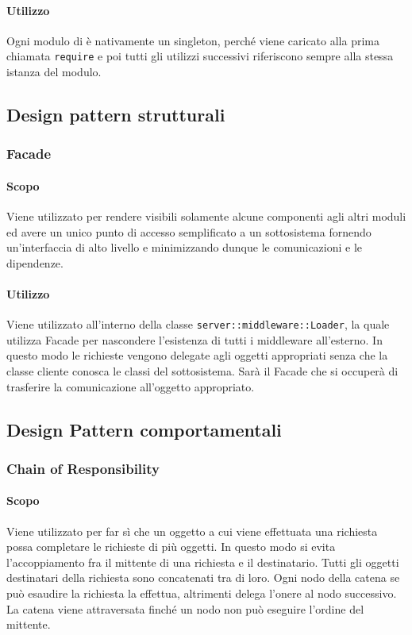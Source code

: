 \documentclass[12pt,a4paper]{article}
\begin{document}
\paragraph{Utilizzo}
Ogni modulo di  è nativamente un singleton, perché viene caricato alla prima chiamata \texttt{require} e poi tutti gli utilizzi successivi riferiscono sempre alla stessa istanza del modulo.

\subsection{Design pattern strutturali}

\subsubsection{Facade}
\paragraph{Scopo}
Viene utilizzato per rendere visibili solamente alcune componenti agli altri moduli ed avere un unico punto di accesso semplificato a un sottosistema fornendo un’interfaccia di alto livello e minimizzando dunque le comunicazioni e le dipendenze.

\paragraph{Utilizzo}
Viene utilizzato all’interno della classe \texttt{server::middleware::Loader}, la quale utilizza Facade per nascondere l’esistenza di tutti i middleware all'esterno. In questo modo le richieste vengono delegate agli oggetti appropriati senza che la classe cliente conosca le classi del sottosistema. Sarà il Facade che si occuperà di trasferire la comunicazione all’oggetto appropriato.

\subsection{Design Pattern comportamentali}
\subsubsection{Chain of Responsibility}

\paragraph{Scopo}
Viene utilizzato per far sì che un oggetto a cui viene effettuata una richiesta possa completare le richieste di più oggetti. In questo modo si evita l’accoppiamento fra il mittente di una richiesta e il destinatario. Tutti gli oggetti destinatari della richiesta sono concatenati tra di loro. Ogni nodo della catena se può esaudire la richiesta la effettua, altrimenti delega l’onere al nodo successivo. La catena viene attraversata finché un nodo non può eseguire l’ordine del mittente.
\end{document}
